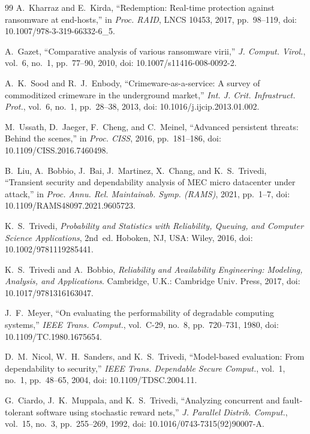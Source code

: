 \documentclass[journal]{IEEEtran}
\begin{document}
\begin{thebibliography}{99}
 A.~Kharraz and E.~Kirda, ``Redemption:
Real-time protection against ransomware at end-hosts,'' in \emph{Proc. RAID},
LNCS 10453, 2017, pp.~98--119, doi: 10.1007/978-3-319-66332-6\_5.

 A.~Gazet, ``Comparative analysis of various
ransomware virii,'' \emph{J. Comput. Virol.}, vol.~6, no.~1, pp.~77--90, 2010,
doi: 10.1007/s11416-008-0092-2.

 A.~K.~Sood and R.~J.~Enbody, ``Crimeware-as-a-service:
A survey of commoditized crimeware in the underground market,'' \emph{Int. J.
Crit. Infrastruct. Prot.}, vol.~6, no.~1, pp.~28--38, 2013,
doi: 10.1016/j.ijcip.2013.01.002.

 M.~Ussath, D.~Jaeger, F.~Cheng, and C.~Meinel,
``Advanced persistent threats: Behind the scenes,'' in \emph{Proc. CISS}, 2016,
pp.~181--186, doi: 10.1109/CISS.2016.7460498.

 B.~Liu, A.~Bobbio, J.~Bai, J.~Martinez, X.~Chang,
and K.~S.~Trivedi, ``Transient security and dependability analysis of MEC micro
datacenter under attack,'' in \emph{Proc. Annu. Rel. Maintainab. Symp. (RAMS)},
2021, pp.~1--7, doi: 10.1109/RAMS48097.2021.9605723.

 K.~S.~Trivedi, \emph{Probability and Statistics
with Reliability, Queuing, and Computer Science Applications}, 2nd~ed. Hoboken,
NJ, USA: Wiley, 2016, doi: 10.1002/9781119285441.

 K.~S.~Trivedi and A.~Bobbio, \emph{Reliability
and Availability Engineering: Modeling, Analysis, and Applications}. Cambridge,
U.K.: Cambridge Univ. Press, 2017, doi: 10.1017/9781316163047.

 J.~F.~Meyer, ``On evaluating the
performability of degradable computing systems,'' \emph{IEEE Trans. Comput.},
vol.~C-29, no.~8, pp.~720--731, 1980, doi: 10.1109/TC.1980.1675654.

 D.~M.~Nicol, W.~H.~Sanders, and K.~S.~Trivedi,
``Model-based evaluation: From dependability to security,'' \emph{IEEE Trans.
Dependable Secure Comput.}, vol.~1, no.~1, pp.~48--65, 2004,
doi: 10.1109/TDSC.2004.11.

 G.~Ciardo, J.~K.~Muppala, and K.~S.~Trivedi,
``Analyzing concurrent and fault-tolerant software using stochastic reward
nets,'' \emph{J. Parallel Distrib. Comput.}, vol.~15, no.~3, pp.~255--269, 1992,
doi: 10.1016/0743-7315(92)90007-A.


\end{thebibliography}
\end{document}
